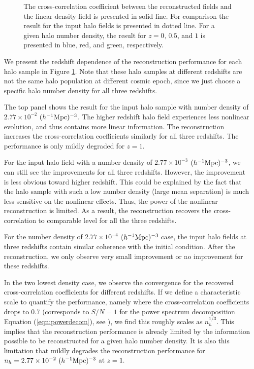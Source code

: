 \documentclass[iop]{emulateapj}
\newcommand{\mpch}{h^{-1} {\rm Mpc}}
\begin{document}
{%
\begin{figure}
\epsfxsize=8.5cm
\caption{The cross-correlation coefficient between the reconstructed fields and the linear density field is presented in solid line.
For comparison the result for the input halo fields is presented in dotted line.
For a given halo number density, the result for $z=0$, $0.5$, and $1$ is presented in blue, red, and green, respectively.}
\label{fig:numevo}
\end{figure}

We present the redshift dependence of the reconstruction performance for each halo sample in Figure \ref{fig:numevo}.
Note that these halo samples at different redshifts are not the same halo population at different cosmic epoch, since we just choose a specific halo number density for all three redshifts.

The top panel shows the result for the input halo sample with number density of $2.77\times 10^{-2}$ $(\mpch)^{-3}$. 
The higher redshift halo field experiences less nonlinear evolution, and thus contains more linear information.
The reconstruction increases the cross-correlation coefficients similarly for all three redshifts.
The performance is only mildly degraded for $z=1$.

For the input halo field with a number density of $2.77\times 10^{-3}$ $(\mpch)^{-3}$, we can still see the improvements for all three redshifts.
However, the improvement is less obvious toward higher redshift.
This could be explained by the fact that the halo sample with such a low number density (large mean separation) is much less sensitive on the nonlinear effects.
Thus, the power of the nonlinear reconstruction is limited.
As a result, the reconstruction recovers the cross-correlation to comparable level for all the three redshifts.

For the number density of $2.77\times 10^{-4}$ $(\mpch)^{-3}$ case, the input halo fields at three redshifts contain similar coherence with the initial condition.
After the reconstruction, we only observe very small improvement or no improvement for these redshifts.

In the two lowest density case, we observe the convergence for the recovered cross-correlation coefficients for different redshifts.
If we define a characteristic scale to quantify the performance, namely where the cross-correlation coefficients drops to 0.7 (corresponds to $S/N=1$ for the power spectrum decomposition Equation (\ref{eqn:powerdecom}), see \cite{zhuhm16a}),   
we find this roughly scales as $n_h^{1/3}$.
This implies that the reconstruction performance is already limited by the information possible to be reconstructed for a given halo number density.
It is also this limitation that mildly degrades the reconstruction performance for $n_h=2.77\times 10^{-2}\ (\mpch)^{-3}$ at $z=1$.


}
\end{document}
